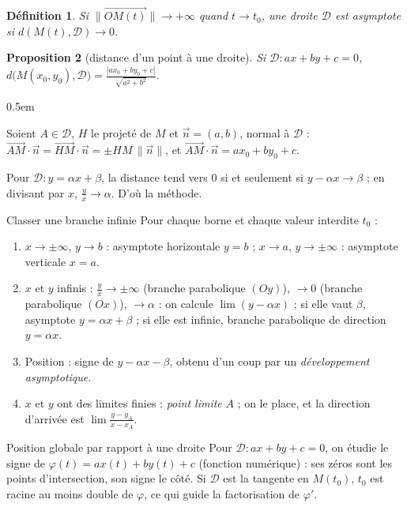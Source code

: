\documentclass[a4paper,11pt]{article}
\makeatletter
\numberwithin{equation}{section}
\numberwithin{figure}{section}
\numberwithin{table}{section}
\theoremstyle{enonce}
\newtheorem{definition}{Définition}[section]
\newtheorem{proposition}[definition]{Proposition}
\theoremstyle{exemple}
\theoremstyle{remarque}
\renewcommand{\proofname}{Démonstration}
\renewenvironment{proof}[1][\proofname]{\par\pushQED{\qed}\normalfont
  \topsep0.5em\relax\trivlist\item[\hskip\labelsep\sffamily\itshape\color{Gris}#1.]\ignorespaces}
  {\popQED\endtrivlist\@endpefalse}
\newcommand{\vv}[1]{\overrightarrow{#1}}
\newcommand{\ve}[1]{\vec{#1}}
\makeatother
\begin{document}
\begin{definition}
Si $\|\vv{OM(t)}\|\to+\infty$ quand $t\to t_0$, une droite $\mathcal D$ est \emph{asymptote} si $d(M(t),\mathcal D)\to0$.
\end{definition}

\begin{proposition}[distance d'un point à une droite]
Si $\mathcal D:ax+by+c=0$, $d\big(M(x_0,y_0),\mathcal D\big)=\frac{|ax_0+by_0+c|}{\sqrt{a^2+b^2}}$.
\end{proposition}

\begin{proof}
Soient $A\in\mathcal D$, $H$ le projeté de $M$ et $\ve n=(a,b)$, normal à $\mathcal D$ :
$\vv{AM}\cdot\ve n=\vv{HM}\cdot\ve n=\pm HM\,\|\ve n\|$, et $\vv{AM}\cdot\ve n=ax_0+by_0+c$.
\end{proof}

Pour $\mathcal D:y=\alpha x+\beta$, la distance tend vers $0$ si et seulement si $y-\alpha x\to\beta$ ; en divisant par $x$,
$\frac yx\to\alpha$. D'où la méthode.

\begin{methode}{Classer une branche infinie}\label{meth:branches}
Pour chaque borne et chaque valeur interdite $t_0$ :
\begin{enumerate}
\item $x\to\pm\infty$, $y\to b$ : asymptote horizontale $y=b$ ; $x\to a$, $y\to\pm\infty$ : asymptote verticale $x=a$.
\item $x$ et $y$ infinis : $\frac yx\to\pm\infty$ (branche parabolique $(Oy)$), $\to0$ (branche parabolique $(Ox)$), $\to\alpha$ :
      on calcule $\lim(y-\alpha x)$ ; si elle vaut $\beta$, asymptote $y=\alpha x+\beta$ ; si elle est infinie, branche parabolique
      de direction $y=\alpha x$.
\item Position : signe de $y-\alpha x-\beta$, obtenu d'un coup par un \emph{développement asymptotique}.
\item $x$ et $y$ ont des limites finies : \emph{point limite} $A$ ; on le place, et la direction d'arrivée est
      $\lim\frac{y-y_A}{x-x_A}$.
\end{enumerate}
\end{methode}

\begin{methode}{Position globale par rapport à une droite}\label{meth:posglob}
Pour $\mathcal D:ax+by+c=0$, on étudie le signe de $\varphi(t)=ax(t)+by(t)+c$ (fonction numérique) : ses zéros sont les
points d'intersection, son signe le côté. Si $\mathcal D$ est la tangente en $M(t_0)$, $t_0$ est racine au moins double de
$\varphi$, ce qui guide la factorisation de $\varphi'$.
\end{methode}
\end{document}
